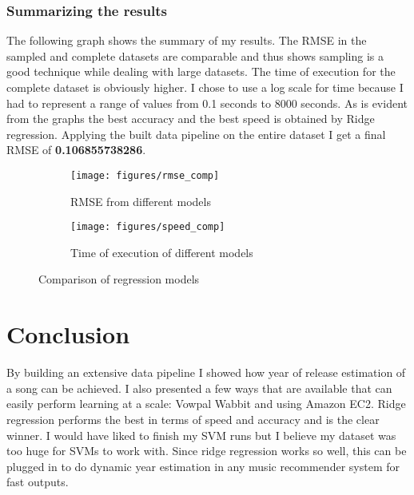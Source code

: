 \documentclass{article} %
\begin{document}
\subsubsection{Summarizing the results}
The following graph shows the summary of my results. The RMSE in the sampled and complete datasets are comparable and thus shows sampling is a good technique while dealing with large datasets. The time of execution for the complete dataset is obviously higher. I chose to use a log scale for time because I had to represent a range of values from 0.1 seconds to 8000 seconds. As is evident from the graphs the best accuracy and the best speed is obtained by Ridge regression. Applying the built data pipeline on the entire dataset I get a final RMSE of \textbf{0.106855738286}.
\begin{figure}[H]
	\begin{subfigure}{.5\textwidth}
		\centering
		\texttt{[image: figures/rmse\_comp]}
		\caption{RMSE from different models}
		\label{pca}
	\end{subfigure} 
	\begin{subfigure}{.5\textwidth}
		\centering
		\texttt{[image: figures/speed\_comp]}
		\caption{Time of execution of different models}
		\label{kbest}
	\end{subfigure} 
	\caption{Comparison of regression models}
\end{figure}

\section{Conclusion}
By building an extensive data pipeline I showed how year of release estimation of a song can be achieved. I also presented a few ways that are available that can easily perform learning at a scale: Vowpal Wabbit and using Amazon EC2. Ridge regression performs the best in terms of speed and accuracy and is the clear winner. I would have liked to finish my SVM runs but I believe my dataset was too huge for SVMs to work with. Since ridge regression works so well, this can be plugged in to do dynamic year estimation in any music recommender system for fast outputs.
\end{document}
